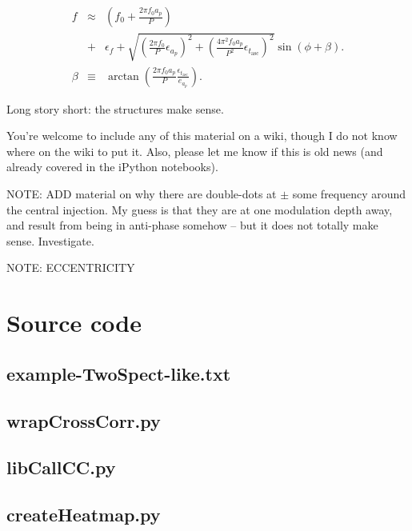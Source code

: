 \documentclass{article}
\begin{document}
\begin{eqnarray}
f &\approx& \left(f_0 + \frac{2\pi f_0 a_p}{P} \right) \nonumber\\
  &+& \epsilon_f  + \sqrt{\left(\frac{2 \pi f_0}{P} \epsilon_{a_p}\right)^2 + \left(\frac{4 \pi^2 f_0 a_p}{P^2} \epsilon_{t_\mathrm{asc}}\right)^2 } \sin \left(\phi + \beta \right).\\
\beta &\equiv& \arctan\left(\frac{2\pi f_0 a_p}{P} \frac{\epsilon_{t_\mathrm{asc}}}{e_{a_p}} \right).
\end{eqnarray}



Long story short: the structures make sense.

You're welcome to include any of this material on a wiki, though I do
not know where on the wiki to put it. Also, please let me know if this
is old news (and already covered in the iPython notebooks).


NOTE: ADD material on why there are double-dots at $\pm$ some frequency around the central injection. My guess is that they are at one modulation depth away, and result from being in anti-phase somehow -- but it does not totally make sense. Investigate.

NOTE: ECCENTRICITY

\newpage

\appendix
\section{Source code}
\label{source_code_appendix}

\subsection{example-TwoSpect-like.txt}

\subsection{wrapCrossCorr.py}

\subsection{libCallCC.py}

\subsection{createHeatmap.py}

\end{document}

